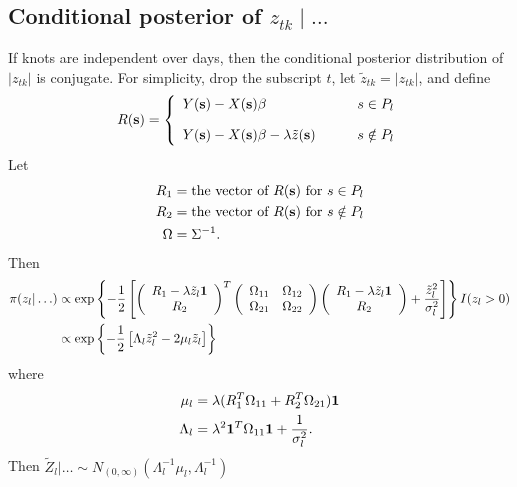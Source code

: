\documentclass[useAMS,usenatbib,referee]{biomweb}
\begin{document}
\subsection*{Conditional posterior of $z_{tk} \mid \ldots $}\label{s:mvcondu}
If knots are independent over days, then the conditional posterior distribution of $|z_{tk}|$ is conjugate.
For simplicity, drop the subscript $t$, let $\tilde{z}_{tk} = |z_{tk}|$, and define
\begin{align*}
R(\mbox{\bf s}) = \left\{
    \begin{array}{ll}
        Y(\mbox{\bf s}) - X(\mbox{\bf s}) \beta &s \in P_l\\[1em]
        Y(\mbox{\bf s}) - X(\mbox{\bf s}) \beta - \lambda \tilde{z}(\mbox{\bf s}) \qquad & s \notin P_l
    \end{array}
\right.
\end{align*}
Let
\begin{align*}
    R_1 &= \text{the vector of } R(\mbox{\bf s}) \text{ for } s \in P_l \\
    R_2 &= \text{the vector of } R(\mbox{\bf s}) \text{ for } s \notin P_l \\
    \Omega &= \Sigma^{-1}.
\end{align*}
Then
\begin{align*}
    \pi(z_l | \ldots) &\propto \exp \left\{ -\frac{ 1 }{ 2 } \left[
        \left( \begin{array}{c}
            R_1 - \lambda \tilde{z}_l \mbox{\boldmath $1$}\\
            R_2
        \end{array} \right)^T
        \left( \begin{array}{cc}
            \Omega_{11} & \Omega_{12}\\
            \Omega_{21} & \Omega_{22}
        \end{array} \right)
        \left( \begin{array}{c}
            R_1 - \lambda \tilde{z}_l \mbox{\boldmath $1$}\\
            R_2
        \end{array} \right)
        +  \frac{ {\tilde{z}_l}^2 }{ \sigma_l^2 }\right]
    \right\} I(z_l > 0) \\
        &\propto \exp \left\{ -\frac{ 1 }{ 2 } \left[ \Lambda_l {\tilde{z}_l}^2 - 2 \mu_l \tilde{z}_l \right] \right\}
\end{align*}
where
\begin{align*}
    \mu_l &= \lambda ( R_1^T \Omega_{11} + R_2^T \Omega_{21} )\mbox{\boldmath $1$}\\
    \Lambda_l &= \lambda^2 \mbox{\boldmath $1$}^T \Omega_{11} \mbox{\boldmath $1$} + \frac{ 1 }{ \sigma^2_l }.
\end{align*}
Then $\tilde{Z}_l | \ldots \sim N_{(0, \infty)} (\Lambda_l^{-1} \mu_l, \Lambda_l^{-1})$
\end{document}
